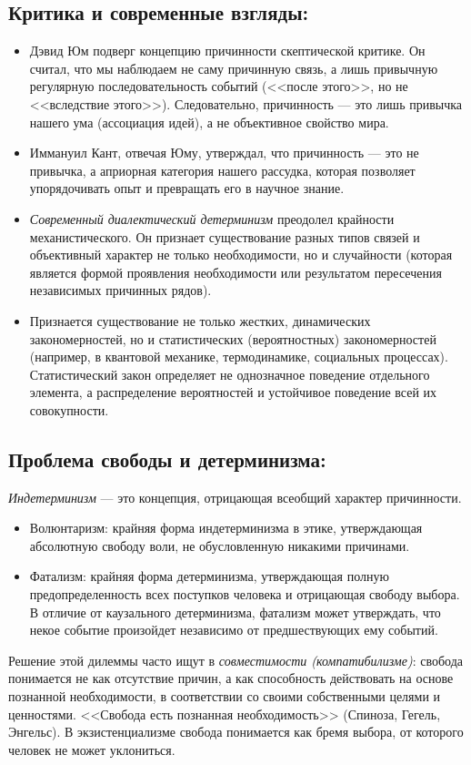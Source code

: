 \documentclass[12pt,a4paper]{article}
\begin{document}
	\subsection{Критика и современные взгляды:}
	\begin{itemize}
		\item Дэвид Юм подверг концепцию причинности скептической критике. Он считал, что мы наблюдаем не саму причинную связь, а лишь привычную регулярную последовательность событий (<<после этого>>, но не <<вследствие этого>>). Следовательно, причинность — это лишь привычка нашего ума (ассоциация идей), а не объективное свойство мира.
		\item Иммануил Кант, отвечая Юму, утверждал, что причинность — это не привычка, а априорная категория нашего рассудка, которая позволяет упорядочивать опыт и превращать его в научное знание.
		\item \textit{Современный диалектический детерминизм} преодолел крайности механистического. Он признает существование разных типов связей и объективный характер не только необходимости, но и случайности (которая является формой проявления необходимости или результатом пересечения независимых причинных рядов).
		\item Признается существование не только жестких, динамических закономерностей, но и статистических (вероятностных) закономерностей (например, в квантовой механике, термодинамике, социальных процессах). Статистический закон определяет не однозначное поведение отдельного элемента, а распределение вероятностей и устойчивое поведение всей их совокупности.
	\end{itemize}
	
	\subsection{Проблема свободы и детерминизма:}
	\textit{Индетерминизм} — это концепция, отрицающая всеобщий характер причинности.
	\begin{itemize}
		\item Волюнтаризм: крайняя форма индетерминизма в этике, утверждающая абсолютную свободу воли, не обусловленную никакими причинами.
		\item Фатализм: крайняя форма детерминизма, утверждающая полную предопределенность всех поступков человека и отрицающая свободу выбора. В отличие от каузального детерминизма, фатализм может утверждать, что некое событие произойдет независимо от предшествующих ему событий.
	\end{itemize}
	Решение этой дилеммы часто ищут в \textit{совместимости (компатибилизме)}: свобода понимается не как отсутствие причин, а как способность действовать на основе познанной необходимости, в соответствии со своими собственными целями и ценностями. <<Свобода есть познанная необходимость>> (Спиноза, Гегель, Энгельс). В экзистенциализме свобода понимается как бремя выбора, от которого человек не может уклониться.
	
\end{document}
